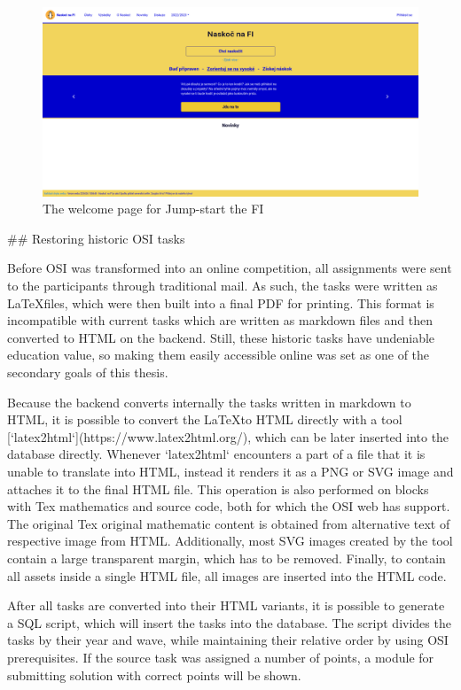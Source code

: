 \documentclass[
  digital, %
  oneside, %
  lof,     %
  lot,     %
]{fithesis4}
\begin{document}
{\begin{figure}
\includegraphics[width=\textwidth]{assets/img/naskoc-na-fi}
\caption{The welcome page for Jump-start the FI}
\label{fig:naskoc-na-fi}
\end{figure}

## Restoring historic OSI tasks

Before OSI was transformed into an online competition, all assignments were sent to the participants through traditional mail. As such, the tasks were written as \LaTeX files, which were then built into a final PDF for printing. This format is incompatible with current tasks which are written as markdown files and then converted to HTML on the backend. Still, these historic tasks have undeniable education value, so making them easily accessible online	was set as one of the secondary goals of this thesis.

Because the backend converts internally the tasks written in markdown to HTML, it is possible to convert the \LaTeX to HTML directly with a tool [`latex2html`](https://www.latex2html.org/), which can be later inserted into the database directly. Whenever `latex2html` encounters a part of a file that it is unable to translate into HTML, instead it renders it as a PNG or SVG image and attaches it to the final HTML file. This operation is also performed on blocks with Tex mathematics and source code, both for which the OSI web has support. The original Tex original mathematic content is obtained from alternative text of respective image from HTML. Additionally, most SVG images created by the tool contain a large transparent margin, which has to be removed. Finally, to contain all assets inside a single HTML file, all images are inserted into the HTML code.

After all tasks are converted into their HTML variants, it is possible to generate a SQL script, which will insert the tasks into the database. The script divides the tasks by their year and wave, while maintaining their relative order by using OSI prerequisites. If the source task was assigned a number of points, a module for submitting solution with correct points will be shown.

}
\end{document}
